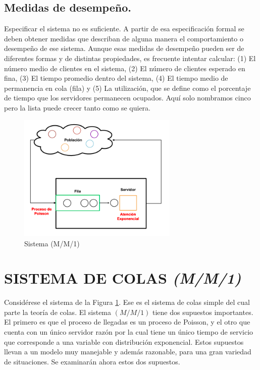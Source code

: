 \subsection{Medidas de desempeño.}
Especificar el sistema no es suficiente. A partir de esa especificación formal se deben obtener medidas que describan de alguna manera el comportamiento o desempeño de ese sistema. Aunque esas medidas de desempeño pueden ser de diferentes formas y de distintas propiedades, es frecuente intentar calcular: (1) El número medio de clientes en el sistema, (2) El número de clientes esperado en fina, (3) El tiempo promedio dentro del sistema, (4) El tiempo medio de permanencia en cola
(fila) y (5) La utilización, que se define como el porcentaje de tiempo que los servidores permanecen ocupados. Aquí solo nombramos cinco pero la lista puede crecer tanto como se quiera.

\begin{figure}[H]
\centering
\includegraphics[width=3in]{chapters/chapter3/figures/Figura1-1:Sistema(mm1).png}
\caption[Sistema (M/M/1)]{Sistema (M/M/1)}
\label{fig:mesh1}
\end{figure}

\section{SISTEMA DE COLAS \textit{(M/M/1)}}
Considérese el sistema de la Figura \ref{fig:mesh1}. Ese es el sistema de colas simple del cual parte la teoría de colas. El sistema $(M/M/1)$ tiene dos supuestos importantes. El primero es que el proceso de llegadas es un proceso de Poisson, y el otro que cuenta con un único servidor razón por la cual tiene un único tiempo de servicio que corresponde a una variable con distribución exponencial. Estos supuestos llevan a un modelo muy manejable y además razonable, para una gran variedad de situaciones. Se examinarán ahora estos dos supuestos.
